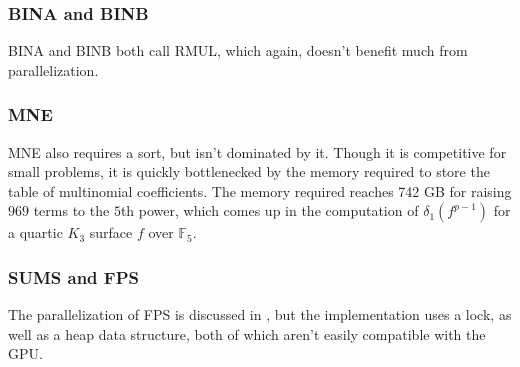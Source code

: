 \subsubsection{BINA and BINB}
BINA and BINB both call RMUL, which again, doesn't benefit much from parallelization.

\subsubsection{MNE}
MNE also requires a sort, but isn't dominated by it. Though it is competitive for small problems, it is quickly bottlenecked by the memory required to store the table of multinomial coefficients. The memory required reaches 742 GB for raising $969$ terms to the $5$th power, which comes up in the computation of $\delta_1(f ^ {p - 1})$ for a quartic $K_3$ surface $f$ over $\mathbb{F}_5$.

\subsubsection{SUMS and FPS}
The parallelization of FPS is discussed in \cite{monagan-2012-sparse-powering}, but the implementation uses a lock, as well as a heap data structure, both of which aren't easily compatible with the GPU.